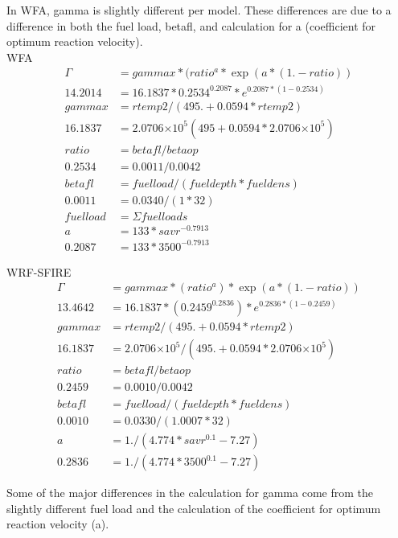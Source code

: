 \documentclass{article}
\newcommand\tenpow[1]{\ensuremath{{\times}10^{#1}}}
\begin{document}
 In WFA, gamma is slightly different per model. These differences are due to a difference in both the fuel load, betafl, and calculation for a (coefficient for optimum reaction velocity).
\\
WFA
\begin{equation}
	\label{gamma_WFA}
	\begin{split}
		\Gamma &= gammax*(ratio^a * \exp(a*(1.-ratio)) \\
		14.2014 &= 16.1837 * 0.2534 ^ {0.2087} * e^{0.2087 * (1 - 0.2534)} \\
		gammax &= rtemp2/(495. + 0.0594*rtemp2) \\
		16.1837 &= 2.0706\tenpow{5} (495 + 0.0594* 2.0706\tenpow{5}) \\
		ratio &= betafl/betaop \\
		0.2534 &= 0.0011 / 0.0042 \\
		betafl &= fuelload/(fueldepth * fueldens) \\
		0.0011 &= 0.0340 / (1 * 32) \\
		fuelload &= \Sigma fuelloads \\ 
	    a &= 133 * savr ^ {-0.7913} \\
		0.2087 &= 133 * 3500^{-0.7913} 
	\end{split}
\end{equation}


WRF-SFIRE
\begin{equation}
	\begin{split}
		\Gamma &= gammax*(ratio^a)*\exp(a*(1.-ratio)) \\
		13.4642 &= 16.1837 * (0.2459 ^ {0.2836}) * e^{0.2836 * (1- 0.2459)} \\
		gammax &= rtemp2/(495. + 0.0594*rtemp2) \\
		16.1837 &= 2.0706 \tenpow{5} / (495. + 0.0594* 2.0706 \tenpow{5}) \\
		ratio &= betafl / betaop \\
		0.2459 &= 0.0010 / 0.0042 \\
		betafl &= fuelload/(fueldepth * fueldens) \\
		0.0010 &= 0.0330 / (1.0007 * 32) \\
		a &= 1./(4.774 * savr^{0.1} - 7.27) \\
		0.2836 &= 1./(4.774 * 3500^{0.1} - 7.27)
	\end{split}
\end{equation}

Some of the major differences in the calculation for gamma come from the slightly different fuel load and the calculation of the coefficient for optimum reaction velocity (a). 
\end{document}
